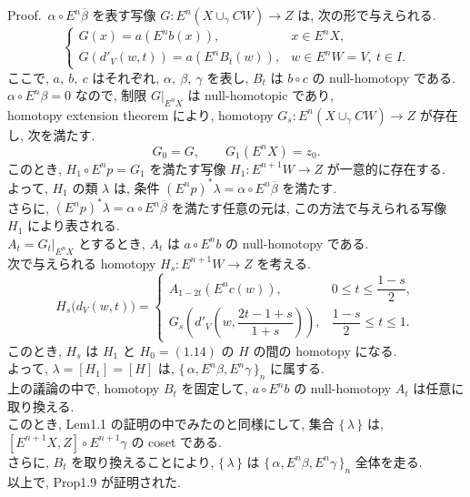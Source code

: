 \documentclass[12pt, leqno]{ltjsarticle}
\newcommand{\Ex}{E}        %
\newcommand{\todai}[2][]{\{\,#2\,\}_{#1}}      %
\newcommand{\gen}[1]{\{\,#1\,\}}       %
\numberwithin{equation}{section}
\theoremstyle{plain}
\theoremstyle{definition}
\theoremstyle{remark}
\begin{document}
Proof.\
\(\alpha\circ E^n\overline{\beta}\) を表す写像 
\(G:E^n(X\cup_\gamma CW)\to Z\) は,
次の形で与えられる.
\[
\begin{cases}
  G(x) = a(E^n b(x)), & x \in E^n X,\\
  G(d'_V(w, t)) = a(E^n B_t(w)), & w \in E^n W = V,\ t \in I.
\end{cases}
\]
ここで,
\(a,\ b,\ c\) はそれぞれ, \(\alpha,\ \beta,\ \gamma\) を表し,
\(B_t\) は \(b\circ c\) の null-homotopy である.\\
\(\alpha\circ E^n\beta = 0\) なので,
制限 \(G|_{E^n X}\) は null-homotopic であり,\\
homotopy extension theorem により, 
homotopy \(G_s:E^n(X\cup_\gamma CW) \to Z\)
が存在し, 次を満たす.
\[
G_0 = G,\qquad 
G_1(E^n X) = z_0.
\]
このとき,
\(H_1\circ E^n p = G_1\) を満たす写像 
\(H_1 : E^{n+1}W \to Z\)
が一意的に存在する.\\
よって,
\(H_1\) の類 \(\lambda\) は, 
条件 \((E^n p)^*\lambda = \alpha\circ E^n\overline\beta\)
を満たす.\\
さらに, 
\((E^n p)^*\lambda = \alpha\circ E^n\overline\beta\)
を満たす任意の元は, 
この方法で与えられる写像 \(H_1\) により表される.\\
\(A_t = G_t|_{E^n X}\) とするとき,
\(A_t\) は \(a\circ E^n b\) の null-homotopy である.\\
次で与えられる homotopy 
$H_s:E^{n+1}W\to Z$ を考える.
\[
H_s\bigl(d_V(w,t)\bigr)=
\begin{cases}
A_{1-2t}\!\left(E^n c(w)\right), 
& 0\le t\le \dfrac{1-s}{2},\\
G_s\!\left(d'_V\!\left(w,\dfrac{2t-1+s}{1+s}\right)\right), 
& \dfrac{1-s}{2}\le t\le 1.
\end{cases}
\]
このとき, 
$H_s$ は $H_1$ と $H_0= (1.14) \text{ の }H$ の間の homotopy になる. \\
よって,
\(\lambda = [H_1] = [H]\) は,
\(\todai[n]{\alpha,\Ex^n\beta,\Ex^n\gamma}\) に属する.\\
上の議論の中で,
homotopy \(B_t\)
を固定して,
\(a\circ E^n b\) の null-homotopy \(A_t\) は任意に取り換える.\\
このとき,
Lem1.1 の証明の中でみたのと同様にして,
集合 \(\gen{\lambda}\) は,
\([E^{n+1}X, Z]\circ E^{n+1}\gamma\) の coset である.\\
さらに,
\(B_t\) を取り換えることにより,
\(\gen{\lambda}\) は
\(\todai[n]{\alpha, E^n\beta, E^n\gamma}\)
全体を走る.\\
以上で, Prop1.9 が証明された. 
\quad
\end{document}
